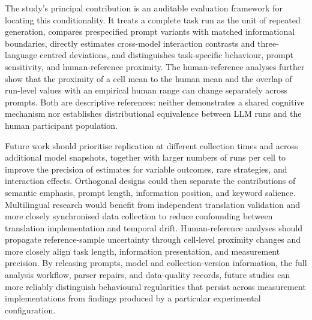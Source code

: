 \documentclass[logo,msc,inf]{infthesis}       %
\begin{document}
The study's principal contribution is an auditable evaluation framework for locating this conditionality. It treats a complete task run as the unit of repeated generation, compares prespecified prompt variants with matched informational boundaries, directly estimates cross-model interaction contrasts and three-language centred deviations, and distinguishes task-specific behaviour, prompt sensitivity, and human-reference proximity. The human-reference analyses further show that the proximity of a cell mean to the human mean and the overlap of run-level values with an empirical human range can change separately across prompts. Both are descriptive references: neither demonstrates a shared cognitive mechanism nor establishes distributional equivalence between LLM runs and the human participant population.

Future work should prioritise replication at different collection times and across additional model snapshots, together with larger numbers of runs per cell to improve the precision of estimates for variable outcomes, rare strategies, and interaction effects. Orthogonal designs could then separate the contributions of semantic emphasis, prompt length, information position, and keyword salience. Multilingual research would benefit from independent translation validation and more closely synchronised data collection to reduce confounding between translation implementation and temporal drift. Human-reference analyses should propagate reference-sample uncertainty through cell-level proximity changes and more closely align task length, information presentation, and measurement precision. By releasing prompts, model and collection-version information, the full analysis workflow, parser repairs, and data-quality records, future studies can more reliably distinguish behavioural regularities that persist across measurement implementations from findings produced by a particular experimental configuration.


\end{document}
